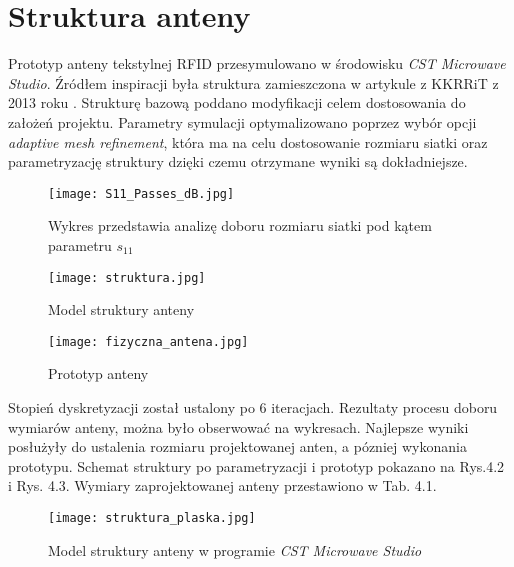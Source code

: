 \section{Struktura anteny}

Prototyp anteny tekstylnej RFID przesymulowano w środowisku \emph{CST Microwave Studio}. Źródłem inspiracji była struktura zamieszczona w artykule z KKRRiT z 2013 roku \cite{Artykul_1}. Strukturę bazową poddano modyfikacji celem dostosowania do założeń projektu. Parametry symulacji optymalizowano poprzez wybór opcji \emph{adaptive mesh refinement}, która ma na celu dostosowanie rozmiaru siatki oraz parametryzację struktury dzięki czemu otrzymane wyniki są dokładniejsze.

\begin{figure}[h!]
\centering
	\texttt{[image: S11\_Passes\_dB.jpg]}
	\caption{Wykres przedstawia analizę doboru rozmiaru siatki pod kątem parametru $s_{11}$}
\end{figure}

\begin{figure}[h!]
	\centering
	    \texttt{[image: struktura.jpg]}
	    \caption{Model struktury anteny}
\end{figure}

\begin{figure}[h!]
	\centering
	    \texttt{[image: fizyczna\_antena.jpg]}
	    \caption{Prototyp anteny}
\end{figure}

\newpage
 Stopień dyskretyzacji został ustalony po 6 iteracjach. Rezultaty procesu doboru wymiarów anteny, można było obserwować na wykresach. Najlepsze wyniki posłużyły do ustalenia rozmiaru projektowanej anten, a pózniej wykonania prototypu. Schemat struktury po parametryzacji i prototyp pokazano na Rys.4.2 i Rys. 4.3. Wymiary zaprojektowanej anteny przestawiono w Tab. 4.1. 

\begin{figure}[h!]
	\centering
	    \texttt{[image: struktura\_plaska.jpg]}
	    \caption{Model struktury anteny w programie \emph{CST Microwave Studio}}
\end{figure}

